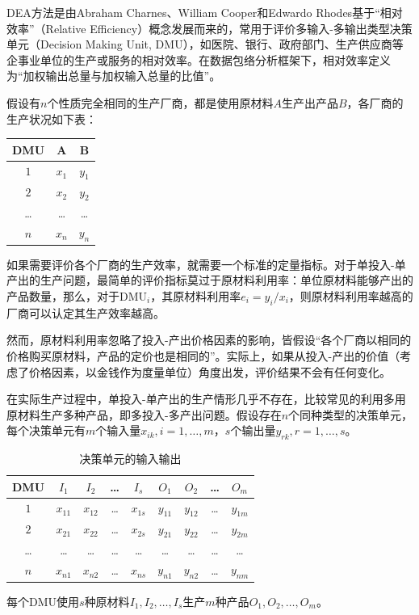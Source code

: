 DEA方法是由Abraham Charnes、William Cooper和Edwardo Rhodes\cite{charnes1978dea}基于“相对效率”（Relative Efficiency）概念发展而来的，常用于评价多输入-多输出类型决策单元（Decision Making Unit, DMU），如医院、银行、政府部门、生产供应商等企事业单位的生产或服务的相对效率。在数据包络分析框架下，相对效率定义为“加权输出总量与加权输入总量的比值”。

假设有$n$个性质完全相同的生产厂商，都是使用原材料$A$生产出产品$B$，各厂商的生产状况如下表：
\begin{table}[htbp]
\centering
\begin{tabular}{|c|c|c|}
  \hline
  DMU & A & B \\
  \hline
  $1$ & $x_1$ & $y_1$ \\
  $2$ & $x_2$ & $y_2$ \\
  \ldots & \ldots& \ldots \\
  $n$ & $x_n$ & $y_n$ \\
  \hline
\end{tabular}
\end{table}

如果需要评价各个厂商的生产效率，就需要一个标准的定量指标。对于单投入-单产出的生产问题，最简单的评价指标莫过于原材料利用率：单位原材料能够产出的产品数量，那么，对于$\mathrm{DMU}_i$，其原材料利用率$e_i = y_i/x_i$，则原材料利用率越高的厂商可以认定其生产效率越高。

然而，原材料利用率忽略了投入-产出价格因素的影响，皆假设“各个厂商以相同的价格购买原材料，产品的定价也是相同的”。实际上，如果从投入-产出的价值（考虑了价格因素，以金钱作为度量单位）角度出发，评价结果不会有任何变化。

在实际生产过程中，单投入-单产出的生产情形几乎不存在，比较常见的利用多用原材料生产多种产品，即多投入-多产出问题。假设存在$n$个同种类型的决策单元，每个决策单元有$m$个输入量$x_{ik},i=1,\ldots,m$，$s$个输出量$y_{rk},r=1,\ldots,s$。

\begin{table}[htbp]\label{tbl:dmu}\caption{决策单元的输入输出}\vskip 2mm
\centering
\begin{tabular}{|c|c|c|c|c||c|c|c|c|}
  \hline
  DMU & $I_1$ & $I_2$ & \ldots & $I_s$ & $O_1$ & $O_2$ & \ldots & $O_m$\\
  \hline
  $1$ & $x_{11}$ & $x_{12}$ & \ldots & $x_{1s}$ &$y_{11}$ & $y_{12}$ & \ldots & $y_{1m}$\\
  $2$ & $x_{21}$ & $x_{22}$ & \ldots & $x_{2s}$ & $y_{21}$ & $y_{22}$ & \ldots & $y_{2m}$\\
  \ldots & \ldots & \ldots & \ldots & \ldots & \ldots & \ldots & \ldots & \ldots\\
  $n$ & $x_{n1}$ & $x_{n2}$ & \ldots & $x_{ns}$ & $y_{n1}$ & $y_{n2}$ & \ldots & $y_{nm}$\\
  \hline
\end{tabular}
\end{table}
每个DMU使用$s$种原材料$I_1,I_2,\ldots, I_s$生产$m$种产品$O_1,O_2,\ldots,O_m$。

